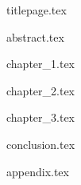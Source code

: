 \documentclass[12pt, a4paper]{article}
\begin{document}
{titlepage.tex}
\newpage

{abstract.tex}
\newpage

\tableofcontents{}
\newpage

\listoffigures
\newpage

\listoftables
\newpage
{}

{chapter_1.tex}
\newpage

{chapter_2.tex}
\newpage

{chapter_3.tex}
\newpage

{conclusion.tex}
\newpage

\printbibliography
\newpage
{appendix.tex}
\end{document}
